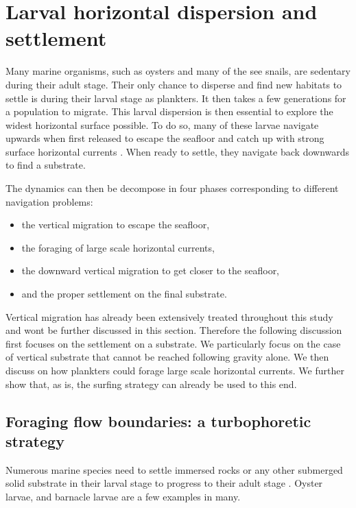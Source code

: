 \chapter{Larval horizontal dispersion and settlement}\label{app:horizontal_dispersion}

Many marine organisms, such as oysters and many of the see snails, are sedentary during their adult stage.
Their only chance to disperse and find new habitats to settle is during their larval stage as plankters.
It then takes a few generations for a population to migrate.
This larval dispersion is then essential to explore the widest horizontal surface possible.
To do so, many of these larvae navigate upwards when first released to escape the seafloor and catch up with strong surface horizontal currents \citep{mcedward2020ecology, welch2001flood, kingsford2002sensory}.
When ready to settle, they navigate back downwards to find a substrate.

The dynamics can then be decompose in four phases corresponding to different navigation problems:
\begin{itemize}
	\item the vertical migration to escape the seafloor,
	\item the foraging of large scale horizontal currents,
	\item the downward vertical migration to get closer to the seafloor,
	\item and the proper settlement on the final substrate.
\end{itemize}
Vertical migration has already been extensively treated throughout this study and wont be further discussed in this section.
Therefore the following discussion first focuses on the settlement on a substrate.
We particularly focus on the case of vertical substrate that cannot be reached following gravity alone.
We then discuss on how plankters could forage large scale horizontal currents.
We further show that, as is, the surfing strategy can already be used to this end.

\section{Foraging flow boundaries: a turbophoretic strategy}

Numerous marine species need to settle immersed rocks or any other submerged solid substrate in their larval stage to progress to their adult stage \citep{eckman1998larval, crimaldi2002hydrodynamics, fuchs2007effects}.
Oyster larvae, \citep{fuchs2013active, fuchs2015hydrodynamic} and barnacle larvae \citep{larsson2016instantaneous} are a few examples in many.

